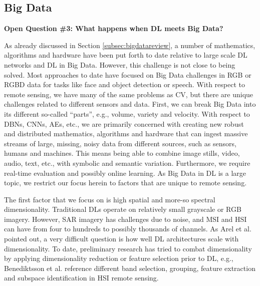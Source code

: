 \documentclass[12pt]{spieman}
\begin{document}
\begin{spacing}{1}
%
%
\subsection{Big Data}
\label{subsec:ChallengesOpportunities_iii}
\textbf{Open Question \#3: What happens when DL meets Big Data?}

As already discussed in Section \ref{subsec:bigdatareview}, a number of mathematics, algorithms and hardware have been put forth to date relative to large scale DL networks and DL in Big Data. However, this challenge is not close to being solved. Most approaches to date have focused on Big Data challenges in RGB or RGBD data for tasks like face and object detection or speech. With respect to remote sensing, we have many of the same problems as CV, but there are unique challenges related to different sensors and data. First, we can break Big Data into its different so-called ``parts'', e.g., volume, variety and velocity. With respect to DBNs, CNNs, AEs, etc., we are primarily concerned with creating new robust and distributed mathematics, algorithms and hardware that can ingest massive streams of large, missing, noisy data from different sources, such as sensors, humans and machines. This means being able to combine image stills, video, audio, text, etc., with symbolic and semantic variation. Furthermore, we require real-time evaluation and possibly online learning. As Big Data in DL is a large topic, we restrict our focus herein to factors that are unique to remote sensing. 

The first factor that we focus on is high spatial and more-so spectral dimensionality. Traditional DLs operate on relatively small grayscale or RGB imagery. However, SAR imagery has challenges due to noise, and MSI and HSI can have from four to hundreds to possibly thousands of channels. As Arel et al. \cite{Arel2010} pointed out, a very difficult question is how well DL architectures scale with dimensionality. To date, preliminary research has tried to combat dimensionality by applying dimensionality reduction or feature selection prior to DL, e.g., Benediktsson et al. \cite{Benediktsson2012} reference different band selection, grouping, feature extraction and subspace identification in HSI remote sensing. 


\end{spacing}
\end{document}
